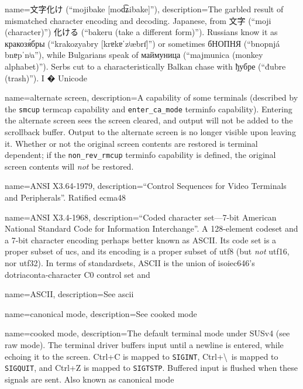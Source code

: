 {
  name={文字化け (``mojibake [{mod͡ʑibake}]'')},
  description={The garbled result of mismatched
    character encoding and decoding. Japanese, from 文字 (``moji (character)'')
    化ける (``bakeru (take a different form)''). Russians know it as \textrussian{кракозя́бры}
    (``krakozyabry [{krɐkɐˈzʲæbrɪ̈}]'') or sometimes
    \textrussian{бНОПНЯ} (``bnopnjá {bnɐpˈnʲa}''), while Bulgarians speak of \textbulgarian{маймуница}
    (``majmunica (monkey alphabet)''). Serbs cut to a characteristically
    Balkan chase with \textrussian{ђубре} (``đubre (trash)''). I {�} Unicode}
}

{
  name={alternate screen},
  description={A capability of some terminals (described by the \texttt{smcup}
    termcap capability and \texttt{enter\_ca\_mode} terminfo capability). 
    Entering the alternate screen sees the screen cleared, and output will not
    be added to the scrollback buffer. Output to the alternate screen is no
    longer visible upon leaving it. Whether or not the original screen contents
    are restored is terminal dependent; if the \texttt{non\_rev\_rmcup}
    terminfo capability is defined, the original screen contents will \textit{not}
    be restored.}
}

{
  name={ANSI X3.64-1979},
  description={``Control Sequences for Video Terminals and Peripherals''.
    Ratified \Gls{ecma48}}
}

{
  name={ANSI X3.4-1968},
  description={``Coded character set---7-bit American National Standard Code
    for Information Interchange''. A 128-element codeset and a 7-bit character
    encoding perhaps better known as ASCII\cite{ascii}. Its code set is a
    proper subset of \Gls{ucs}, and its encoding is a proper subset of
    \gls{utf8} (but \textit{not} \gls{utf16}, nor \gls{utf32}). In terms of
    \gls{standardsets}, ASCII is the union of \Gls{isoiec646}'s
    dotriaconta-character \Gls{C0} control set and }
}

{
  name={ASCII},
  description={See \Gls{ascii}}
}

{
  name={canonical mode},
  description={See \gls{cooked mode}}
}

{
  name={cooked mode},
description={The default terminal mode under SUSv4 (see \gls{raw mode}).
  The terminal driver buffers input until a newline is entered, while echoing
  it to the screen. Ctrl+C is mapped to \texttt{SIGINT}, Ctrl+\textbackslash\ is
  mapped to \texttt{SIGQUIT}, and Ctrl+Z is mapped to \texttt{SIGTSTP}.
  Buffered input is flushed when these signals are sent. Also known as
  \gls{canonical mode}}
}

